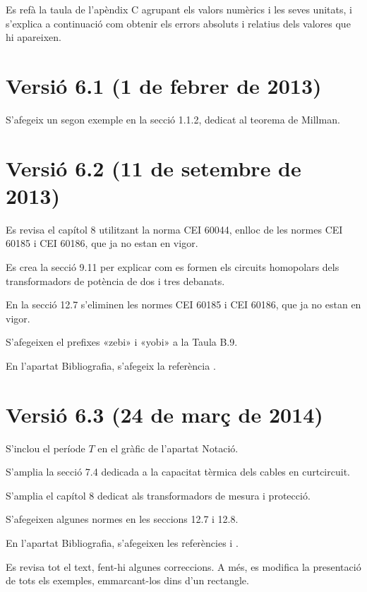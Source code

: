 Es refà la taula de l'apèndix C agrupant els valors numèrics i les seves unitats, i s'explica a continuació com obtenir els errors absoluts i relatius dels valores que hi apareixen.

\section*{Versió 6.1 (1 de febrer de 2013)}

S'afegeix un segon exemple en la secció 1.1.2, dedicat al teorema de Millman.


\section*{Versió 6.2 (11 de setembre de 2013)}

 Es revisa el capítol 8 utilitzant la norma CEI 60044, enlloc de les normes CEI 60185 i CEI 60186, que ja no estan en vigor.

Es crea la secció 9.11 per explicar com es formen els circuits homopolars dels transformadors de potència de dos i tres debanats.

En la secció 12.7 s'eliminen les normes CEI 60185 i CEI 60186, que ja no estan en vigor.

S'afegeixen el prefixes «zebi» i «yobi» a la Taula B.9.

En l'apartat Bibliografia, s'afegeix la referència \cite{RASe}.

\section*{Versió 6.3 (24 de març de 2014)}

S'inclou el període $T$ en el gràfic de l'apartat Notació.

S'amplia la secció 7.4 dedicada a la capacitat tèrmica dels cables en curtcircuit.

S'amplia el capítol 8 dedicat als transformadors de mesura i protecció.

S'afegeixen algunes normes en les seccions 12.7 i 12.8.

En l'apartat Bibliografia, s'afegeixen les referències \cite{KAS} i \cite{JCD}.

Es revisa tot el text, fent-hi algunes correccions. A més, es modifica la presentació de tots els exemples, emmarcant-los dins d'un rectangle.


